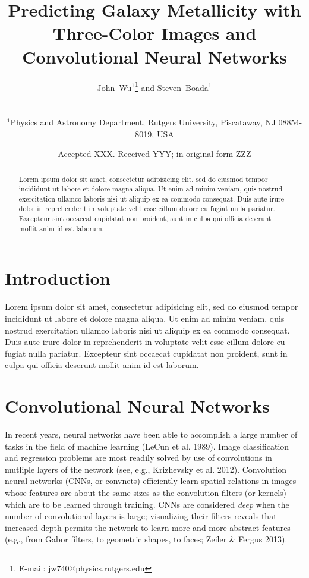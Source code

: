 \documentclass[fleqn,usenatbib]{mnras}
\title[Metallicity with CNNs]{Predicting Galaxy Metallicity with Three-Color Images and Convolutional Neural Networks}
\author[Wu and Boada]
{\parbox{\textwidth}{John~Wu$^{1}$\thanks{E-mail: jw740@physics.rutgers.edu} and
Steven~Boada$^{1}$}\vspace{0.4cm}\
\\
\parbox{\textwidth}{$^{1}$Physics and Astronomy Department, Rutgers University, Piscataway, NJ 08854-8019, USA\\}}
\date{Accepted XXX. Received YYY; in original form ZZZ}
\begin{document}
\label{firstpage}
\pagerange{\pageref{firstpage}--\pageref{lastpage}}
\maketitle

\begin{abstract}
\noindent
Lorem ipsum dolor sit amet, consectetur adipisicing elit, sed do eiusmod tempor incididunt ut labore et dolore magna aliqua. Ut enim ad minim veniam, quis nostrud exercitation ullamco laboris nisi ut aliquip ex ea commodo consequat. Duis aute irure dolor in reprehenderit in voluptate velit esse cillum dolore eu fugiat nulla pariatur. Excepteur sint occaecat cupidatat non proident, sunt in culpa qui officia deserunt mollit anim id est laborum.
\end{abstract}

\section{Introduction}\label{sec:introduction}
Lorem ipsum dolor sit amet, consectetur adipisicing elit, sed do eiusmod tempor incididunt ut labore et dolore magna aliqua. Ut enim ad minim veniam, quis nostrud exercitation ullamco laboris nisi ut aliquip ex ea commodo consequat. Duis aute irure dolor in reprehenderit in voluptate velit esse cillum dolore eu fugiat nulla pariatur. Excepteur sint occaecat cupidatat non proident, sunt in culpa qui officia deserunt mollit anim id est laborum.

\section{Convolutional Neural Networks}\label{sec:CNN}
In recent years, neural networks have been able to accomplish a large number of tasks in the field of machine learning (LeCun et al. 1989).
Image classification and regression problems are most readily solved by use of convolutions in mutliple layers of the network (see, e.g., Krizhevsky et al. 2012).
Convolution neural networks (CNNs, or convnets) efficiently learn spatial relations in images whose features are about the same sizes as the convolution filters (or kernels) which are to be learned through training.
CNNs are considered \textit{deep} when the number of convolutional layers is large; visualizing their filters reveals that increased depth permits the network to learn more and more abstract features (e.g., from Gabor filters, to geometric shapes, to faces; Zeiler \& Fergus 2013).
\end{document}
